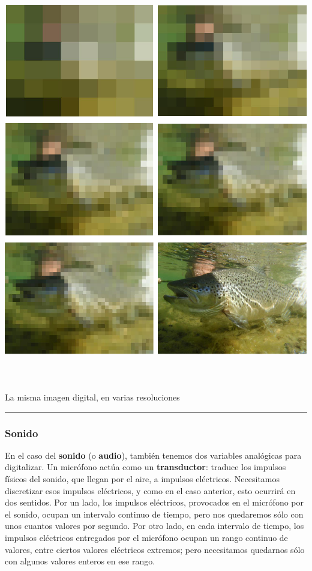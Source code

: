 \documentclass[a4paper]{article}
\begin{document}
\begin{center}
\begin{minipage}{17cm}
\includegraphics[width=15.309cm,height=17.687cm]{IC2020Codificacion20de20datos-img3.png}{\centering\itshape\par
La misma imagen digital, en varias resoluciones
\par}
\end{minipage}
\rule{\textwidth}{0.005in}
\end{center}

\subsubsection{Sonido}
En el caso del \textbf{sonido} (o \textbf{audio}), también tenemos dos
variables analógicas para digitalizar. Un micrófono actúa como un
\textbf{transductor}: traduce los impulsos físicos del sonido, que
llegan por el aire, a impulsos eléctricos. Necesitamos discretizar
esos impulsos eléctricos, y como en el caso anterior, esto ocurrirá
en dos sentidos. Por un lado, los impulsos eléctricos, provocados en
el micrófono por el sonido, ocupan un intervalo continuo de tiempo,
pero nos quedaremos sólo con unos cuantos valores por segundo. Por
otro lado, en cada intervalo de tiempo, los impulsos eléctricos
entregados por el micrófono ocupan un rango continuo de valores,
entre ciertos valores eléctricos extremos; pero necesitamos quedarnos
sólo con algunos valores enteros en ese rango. 
\end{document}
